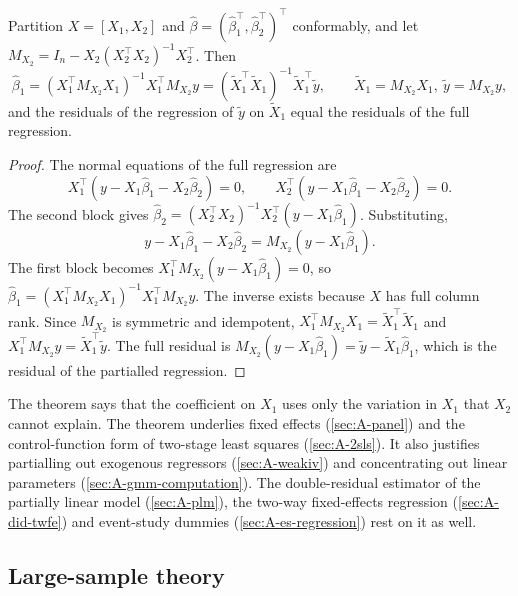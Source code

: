 \begin{theorem}\label{thm:A-fwl}
Partition $X = [X_1, X_2]$ and $\hat\beta = (\hat\beta_1^\top, \hat\beta_2^\top)^\top$ conformably, and let
$M_{X_2} = I_n - X_2(X_2^\top X_2)^{-1}X_2^\top$. Then
\begin{equation}\label{eq:A-fwl}
\hat\beta_1 = (X_1^\top M_{X_2} X_1)^{-1}X_1^\top M_{X_2} y = (\tilde X_1^\top\tilde X_1)^{-1}\tilde X_1^\top\tilde y,
\qquad \tilde X_1 = M_{X_2}X_1,\ \tilde y = M_{X_2} y ,
\end{equation}
and the residuals of the regression of $\tilde y$ on $\tilde X_1$ equal the residuals of the full regression.
\end{theorem}

\begin{proof}
The normal equations of the full regression are
\begin{equation*}
X_1^\top(y - X_1\hat\beta_1 - X_2\hat\beta_2) = 0, \qquad X_2^\top(y - X_1\hat\beta_1 - X_2\hat\beta_2) = 0 .
\end{equation*}
The second block gives $\hat\beta_2 = (X_2^\top X_2)^{-1}X_2^\top(y - X_1\hat\beta_1)$. Substituting,
\begin{equation*}
y - X_1\hat\beta_1 - X_2\hat\beta_2 = M_{X_2}(y - X_1\hat\beta_1) .
\end{equation*}
The first block becomes $X_1^\top M_{X_2}(y - X_1\hat\beta_1) = 0$, so
$\hat\beta_1 = (X_1^\top M_{X_2}X_1)^{-1}X_1^\top M_{X_2}y$. The inverse exists because $X$ has full column rank.
Since $M_{X_2}$ is symmetric and idempotent, $X_1^\top M_{X_2}X_1 = \tilde X_1^\top\tilde X_1$ and
$X_1^\top M_{X_2}y = \tilde X_1^\top\tilde y$. The full residual is $M_{X_2}(y - X_1\hat\beta_1) = \tilde y -
\tilde X_1\hat\beta_1$, which is the residual of the partialled regression.
\end{proof}

The theorem says that the coefficient on $X_1$ uses only the variation in $X_1$ that $X_2$ cannot explain.
The theorem underlies fixed effects (\cref{sec:A-panel}) and the control-function form of two-stage
least squares (\cref{sec:A-2sls}). It also justifies partialling out exogenous regressors
(\cref{sec:A-weakiv}) and concentrating out linear parameters (\cref{sec:A-gmm-computation}). The
double-residual estimator of the partially linear model (\cref{sec:A-plm}), the two-way fixed-effects
regression (\cref{sec:A-did-twfe}) and event-study dummies (\cref{sec:A-es-regression}) rest on it as well.

\subsection{Large-sample theory}\label{sec:A-ols-asy}

